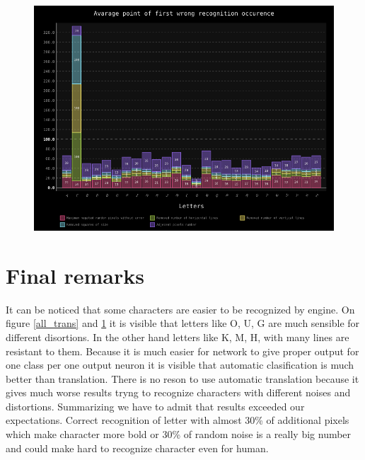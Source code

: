 \documentclass[a4paper]{article}
\begin{document}
\begin{figure}[h!]
	\centering
	\includegraphics[scale=0.7,keepaspectratio=true]{Charts/AllTestPlanResultsChart_ClasifierTester.png}	
	\caption{}
	\label{all_clas}
\end{figure}
\pagebreak
\section{Final remarks}
It can be noticed that some characters are easier to be recognized by engine.
On figure \ref{all_trans} and \ref{all_clas} it is visible that letters like O, U, G are much sensible for different disortions. In the other hand letters like K, M, H, with many lines are resistant to them.
Because it is much easier for network to give proper output for one class per one output neuron it is visible that automatic clasification is much better than translation. There is no reson to use automatic translation because it gives much worse results tryng to recognize characters with different noises and distortions.
Summarizing we have to admit that results exceeded our expectations. Correct recognition of letter with almost 30\% of additional pixels which make character more bold or 30\% of random noise is a really big number and could make hard to recognize character even for human.
\end{document}

